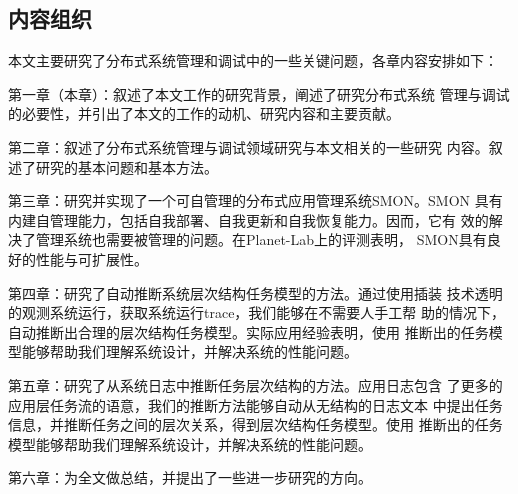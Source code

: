 \subsection{内容组织}

本文主要研究了分布式系统管理和调试中的一些关键问题，各章内容安排如下：


  第一章（本章）：叙述了本文工作的研究背景，阐述了研究分布式系统
  管理与调试的必要性，并引出了本文的工作的动机、研究内容和主要贡献。

  第二章：叙述了分布式系统管理与调试领域研究与本文相关的一些研究
  内容。叙述了研究的基本问题和基本方法。

  第三章：研究并实现了一个可自管理的分布式应用管理系统SMON。SMON
  具有内建自管理能力，包括自我部署、自我更新和自我恢复能力。因而，它有
  效的解决了管理系统也需要被管理的问题。在Planet-Lab上的评测表明，
  SMON具有良好的性能与可扩展性。
  
  第四章：研究了自动推断系统层次结构任务模型的方法。通过使用插装
  技术透明的观测系统运行，获取系统运行trace，我们能够在不需要人手工帮
  助的情况下，自动推断出合理的层次结构任务模型。实际应用经验表明，使用
  推断出的任务模型能够帮助我们理解系统设计，并解决系统的性能问题。

  第五章：研究了从系统日志中推断任务层次结构的方法。应用日志包含
  了更多的应用层任务流的语意，我们的推断方法能够自动从无结构的日志文本
  中提出任务信息，并推断任务之间的层次关系，得到层次结构任务模型。使用
  推断出的任务模型能够帮助我们理解系统设计，并解决系统的性能问题。

  第六章：为全文做总结，并提出了一些进一步研究的方向。


